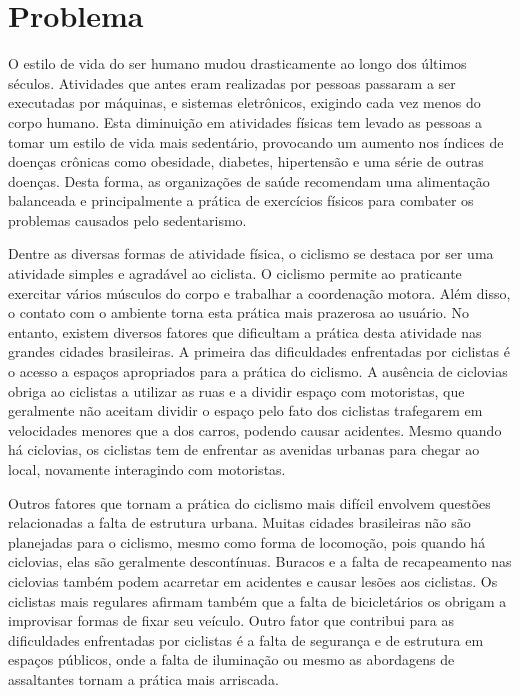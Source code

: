 \chapter[Problema]{Problema}

O estilo de vida do ser humano mudou drasticamente ao longo dos últimos séculos. Atividades que antes eram realizadas por pessoas passaram a ser executadas 
por máquinas, e sistemas eletrônicos, exigindo cada vez menos do corpo humano. Esta diminuição em atividades físicas tem levado as pessoas a tomar um estilo 
de vida mais sedentário, provocando um aumento nos índices de doenças crônicas como obesidade, diabetes, hipertensão e uma série de outras doenças. Desta forma, 
as organizações de saúde recomendam uma alimentação balanceada e principalmente a prática de exercícios físicos para combater os problemas causados pelo 
sedentarismo.

Dentre as diversas formas de atividade física, o ciclismo se destaca por ser uma atividade simples e agradável ao ciclista. O ciclismo permite ao praticante 
exercitar vários músculos do corpo e trabalhar a coordenação motora. Além disso, o contato com o ambiente torna esta prática mais prazerosa ao usuário. No 
entanto, existem diversos fatores que dificultam a prática desta atividade nas grandes cidades brasileiras.
A primeira das dificuldades enfrentadas por ciclistas é o acesso a espaços apropriados para a prática do ciclismo. A ausência de ciclovias obriga ao ciclistas 
a utilizar as ruas e a dividir espaço com motoristas, que geralmente não aceitam dividir o espaço pelo fato dos ciclistas trafegarem em velocidades menores que 
a dos carros, podendo causar acidentes. Mesmo quando há ciclovias, os ciclistas tem de enfrentar as avenidas urbanas para chegar ao local, novamente interagindo 
com motoristas.

Outros fatores que tornam a prática do ciclismo mais difícil envolvem questões relacionadas a falta de estrutura urbana. Muitas cidades brasileiras não são 
planejadas para o ciclismo, mesmo como forma de locomoção, pois quando há ciclovias, elas são geralmente descontínuas. Buracos e a falta de recapeamento nas 
ciclovias também podem acarretar em acidentes e causar lesões aos ciclistas. Os ciclistas mais regulares afirmam também que a falta de bicicletários os obrigam 
a improvisar formas de fixar seu veículo. Outro fator que contribui para as dificuldades enfrentadas por ciclistas é a falta de segurança e de estrutura em 
espaços públicos, onde a falta de iluminação ou mesmo as abordagens de assaltantes tornam a prática mais arriscada.

